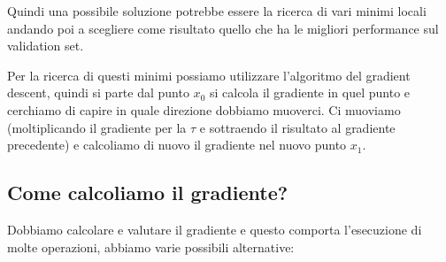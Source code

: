 \documentclass[14pt]{extreport}
\begin{document}
Quindi una possibile soluzione potrebbe essere la ricerca di vari minimi locali andando poi a scegliere come risultato quello che ha le migliori
performance sul validation set.

Per la ricerca di questi minimi possiamo utilizzare l'algoritmo del gradient descent, quindi si parte dal punto $x_0$ si calcola il gradiente in quel
punto e cerchiamo di capire in quale direzione dobbiamo muoverci. Ci muoviamo (moltiplicando il gradiente per la $\tau$ e sottraendo il risultato al
gradiente precedente) e calcoliamo di nuovo il gradiente nel nuovo punto $x_1$.

\subsection{Come calcoliamo il gradiente?}

Dobbiamo calcolare e valutare il gradiente e questo comporta l'esecuzione di molte operazioni, abbiamo varie possibili alternative:
\end{document}
